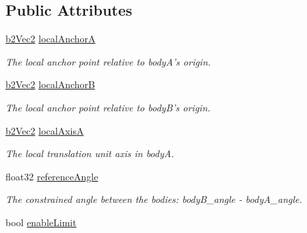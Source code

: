 \subsection*{Public Attributes}
\begin{DoxyCompactItemize}
\item 
\hypertarget{structb2_prismatic_joint_def_abb51df8daff7a55f47adc83e4f7fa5b9}{\hyperlink{structb2_vec2}{b2\-Vec2} \hyperlink{structb2_prismatic_joint_def_abb51df8daff7a55f47adc83e4f7fa5b9}{local\-Anchor\-A}}\label{structb2_prismatic_joint_def_abb51df8daff7a55f47adc83e4f7fa5b9}

\begin{DoxyCompactList}\small\item\em The local anchor point relative to body\-A's origin. \end{DoxyCompactList}\item 
\hypertarget{structb2_prismatic_joint_def_a5acc1f2f14d1b659fc9d804ab1baf4a3}{\hyperlink{structb2_vec2}{b2\-Vec2} \hyperlink{structb2_prismatic_joint_def_a5acc1f2f14d1b659fc9d804ab1baf4a3}{local\-Anchor\-B}}\label{structb2_prismatic_joint_def_a5acc1f2f14d1b659fc9d804ab1baf4a3}

\begin{DoxyCompactList}\small\item\em The local anchor point relative to body\-B's origin. \end{DoxyCompactList}\item 
\hypertarget{structb2_prismatic_joint_def_af36fdbcedca5a392a2649cd235c42676}{\hyperlink{structb2_vec2}{b2\-Vec2} \hyperlink{structb2_prismatic_joint_def_af36fdbcedca5a392a2649cd235c42676}{local\-Axis\-A}}\label{structb2_prismatic_joint_def_af36fdbcedca5a392a2649cd235c42676}

\begin{DoxyCompactList}\small\item\em The local translation unit axis in body\-A. \end{DoxyCompactList}\item 
\hypertarget{structb2_prismatic_joint_def_aa84b43d08e6e11b4daa0c86f46094463}{float32 \hyperlink{structb2_prismatic_joint_def_aa84b43d08e6e11b4daa0c86f46094463}{reference\-Angle}}\label{structb2_prismatic_joint_def_aa84b43d08e6e11b4daa0c86f46094463}

\begin{DoxyCompactList}\small\item\em The constrained angle between the bodies\-: body\-B\-\_\-angle -\/ body\-A\-\_\-angle. \end{DoxyCompactList}\item 
\hypertarget{structb2_prismatic_joint_def_aa61a03b68caac62a5cf66354f6756eae}{bool \hyperlink{structb2_prismatic_joint_def_aa61a03b68caac62a5cf66354f6756eae}{enable\-Limit}}\label{structb2_prismatic_joint_def_aa61a03b68caac62a5cf66354f6756eae}


\end{DoxyCompactItemize}
